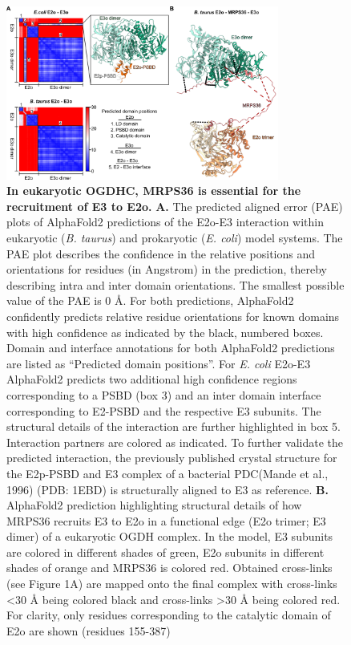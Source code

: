 \documentclass[times, twoside]{zHenriquesLab-StyleBioRxiv}
\begin{document}
\begin{figure}[h]
    \centering
    \includegraphics[width=0.8\textwidth]{Figure4}
    \caption{\textbf{In eukaryotic OGDHC, MRPS36 is essential for the recruitment of E3 to E2o.} \textbf{A.} The predicted aligned error (PAE) plots of AlphaFold2 predictions of the E2o-E3 interaction within eukaryotic (\emph{B. taurus}) and prokaryotic (\emph{E. coli}) model systems. The PAE plot describes the confidence in the relative positions and orientations for residues (in Angstrom) in the prediction, thereby describing intra and inter domain orientations. The smallest possible value of the PAE is 0 Å. For both predictions, AlphaFold2 confidently predicts relative residue orientations for known domains with high confidence as indicated by the black, numbered boxes. Domain and interface annotations for both AlphaFold2 predictions are listed as “Predicted domain positions”. For \emph{E. coli} E2o-E3 AlphaFold2 predicts two additional high confidence regions corresponding to a PSBD (box 3) and an inter domain interface corresponding to E2-PSBD and the respective E3 subunits. The structural details of the interaction are further highlighted in box 5. Interaction partners are colored as indicated. To further validate the predicted interaction, the previously published crystal structure for the E2p-PSBD and E3 complex of a bacterial PDC(Mande et al., 1996) (PDB: 1EBD) is structurally aligned to E3 as reference. \textbf{B.} AlphaFold2 prediction highlighting structural details of how MRPS36 recruits E3 to E2o in a functional edge (E2o trimer; E3 dimer) of a eukaryotic OGDH complex. In the model, E3 subunits are colored in different shades of green, E2o subunits in different shades of orange and MRPS36 is colored red. Obtained cross-links (see Figure 1A) are mapped onto the final complex with cross-links <30 Å being colored black and cross-links >30 Å being colored red. For clarity, only residues corresponding to the catalytic domain of E2o are shown (residues 155-387)}
    \label{fig:img1}
\end{figure}
\end{document}
